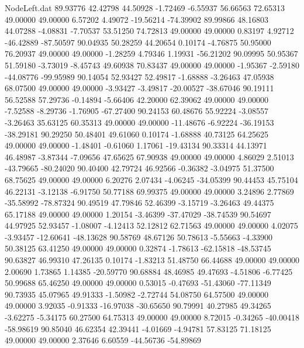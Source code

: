 \begin{filecontents}{NodeLeft.dat}
  89.93776   42.42798   44.50928    -1.72469   -6.55937   56.66563   72.65313   49.00000   49.00000    6.57202    4.49072  -19.56214  -74.39902
  89.99866   48.16803   44.07288    -4.08831   -7.70537   53.51250   74.72813   49.00000   49.00000    0.83197    4.92712  -46.42889  -87.50597
  90.04935   50.28259   44.20654     0.10174   -4.76875   50.95000   76.20937   49.00000   49.00000   -1.28259    4.79346    1.19931  -56.21202
  90.09995   50.95367   51.59180    -3.73019   -8.45743   49.60938   70.83437   49.00000   49.00000   -1.95367   -2.59180  -44.08776  -99.95989
  90.14054   52.93427   52.49817    -1.68888   -3.26463   47.05938   68.07500   49.00000   49.00000   -3.93427   -3.49817  -20.00527  -38.67046
  90.19111   56.52588   57.29736    -0.14894   -5.66406   42.20000   62.39062   49.00000   49.00000   -7.52588   -8.29736   -1.76905  -67.27400
  90.24153   60.48676   55.92224    -3.08557   -3.26463   35.63125   60.35313   49.00000   49.00000  -11.48676   -6.92224  -36.19153  -38.29181
  90.29250   50.48401   49.61060     0.10174   -1.68888   40.73125   64.25625   49.00000   49.00000   -1.48401   -0.61060    1.17061  -19.43134
  90.33314   44.13971   46.48987    -3.87344   -7.09656   47.65625   67.90938   49.00000   49.00000    4.86029    2.51013  -43.79665  -80.24020
  90.40400   42.79724   46.92566    -0.36382   -3.04975   51.37500   68.75625   49.00000   49.00000    6.20276    2.07434   -4.06245  -34.05399
  90.44453   45.75104   46.22131    -3.12138   -6.91750   50.77188   69.99375   49.00000   49.00000    3.24896    2.77869  -35.58992  -78.87324
  90.49519   47.79846   52.46399    -3.15719   -3.26463   49.44375   65.17188   49.00000   49.00000    1.20154   -3.46399  -37.47029  -38.74539
  90.54697   44.97925   52.93457    -1.08007   -4.12413   52.12812   62.71563   49.00000   49.00000    4.02075   -3.93457  -12.60641  -48.13628
  90.58769   48.67126   50.78613    -5.55663   -4.33900   50.38125   63.41250   49.00000   49.00000    0.32874   -1.78613  -62.15818  -48.53745
  90.63827   46.99310   47.26135     0.10174   -1.83213   51.48750   66.44688   49.00000   49.00000    2.00690    1.73865    1.14385  -20.59770
  90.68884   48.46985   49.47693    -4.51806   -6.77425   50.99688   65.46250   49.00000   49.00000    0.53015   -0.47693  -51.43060  -77.11349
  90.73935   45.07965   49.91333    -1.50982   -2.72744   54.08750   64.57500   49.00000   49.00000    3.92035   -0.91333  -16.97038  -30.65650
  90.79991   40.27985   49.34265    -3.62275   -5.34175   60.27500   64.75313   49.00000   49.00000    8.72015   -0.34265  -40.00418  -58.98619
  90.85040   46.62354   42.39441    -4.01669   -4.94781   57.83125   71.18125   49.00000   49.00000    2.37646    6.60559  -44.56736  -54.89869

\end{filecontents}
